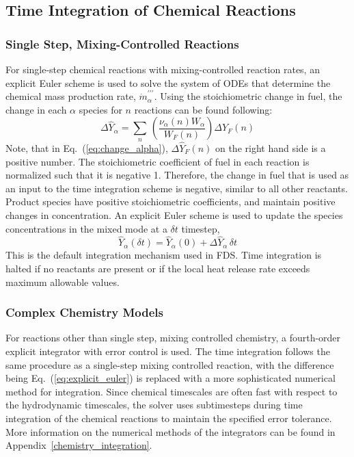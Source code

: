 \subsection{Time Integration of Chemical Reactions}
\label{sec:reac_time_integration}

\subsubsection{Single Step, Mixing-Controlled Reactions}
For single-step chemical reactions with mixing-controlled reaction rates, an explicit Euler scheme is used to solve the system of ODEs that determine the chemical mass production rate, $\dot{m}^{\prime\prime\prime}_{\alpha}$. Using the stoichiometric change in fuel, the change in each $\alpha$ species for $n$ reactions can be found following:
\begin{equation}\label{eq:change_alpha}
\Delta \hat{Y}_{\alpha} = \sum_n \,\left(\frac{\nu_{\alpha}(n)W_{\alpha}}{W_{F}(n)}\right)\Delta \hat{Y}_{F}(n)
\end{equation}
Note, that in Eq.~(\ref{eq:change_alpha}), $\Delta \hat{Y}_{F}(n)$ on the right hand side is a positive number. The stoichiometric coefficient of fuel in each reaction is normalized such that it is negative 1. Therefore, the change in fuel that is used as an input to the time integration scheme is negative, similar to all other reactants. Product species have positive stoichiometric coefficients, and maintain positive changes in concentration.
An explicit Euler scheme is used to update the species concentrations in the mixed mode at a $\delta t$ timestep,
\begin{equation}\label{eq:explicit_euler} 
\hat{Y}_{\alpha}(\delta t) = \hat{Y}_{\alpha}(0) + \Delta \hat{Y}_{\alpha}\, \delta t
\end{equation}
This is the default integration mechanism used in FDS. Time integration is halted if no reactants are present or if the local heat release rate exceeds maximum allowable values.

\subsubsection{Complex Chemistry Models}

For reactions other than single step, mixing controlled chemistry, a fourth-order explicit integrator with error control is used. The time integration follows the same procedure as a single-step mixing controlled reaction, with the difference being Eq.~(\ref{eq:explicit_euler}) is replaced with a more sophisticated numerical method for integration. Since chemical timescales are often fast with respect to the hydrodynamic timescales, the solver uses subtimesteps during time integration of the chemical reactions to maintain the specified error tolerance. More information on the numerical methods of the integrators can be found in Appendix~\ref{chemistry_integration}.


